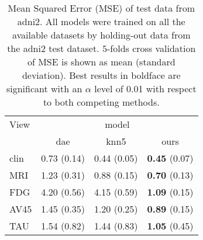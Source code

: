 \begin{table}[!t]
\caption{
Mean Squared Error (MSE) of test data from adni2.
All models were trained on all the available datasets by holding-out data from the adni2 test dataset.
$5$-folds cross validation of MSE is shown as mean (standard deviation).
Best results in boldface are significant with an $\alpha$ level of 0.01 with respect to both competing methods.
}
\centering
\label{tab:model_comparison}
\begin{tabular}{lccc}
\toprule
View       &          \multicolumn{3}{c}{model}\\
           &          dae &         knn5 &           ours        \\ \cline{2-4}
clin       &  0.73 (0.14) &  0.44 (0.05) &  \textbf{0.45} (0.07) \\
MRI        &  1.23 (0.31) &  0.88 (0.15) &  \textbf{0.70} (0.13) \\
FDG        &  4.20 (0.56) &  4.15 (0.59) &  \textbf{1.09} (0.15) \\
AV45       &  1.45 (0.35) &  1.20 (0.25) &  \textbf{0.89} (0.15) \\
TAU        &  1.54 (0.82) &  1.44 (0.83) &  \textbf{1.05} (0.45) \\
\bottomrule
\end{tabular}
\end{table}

